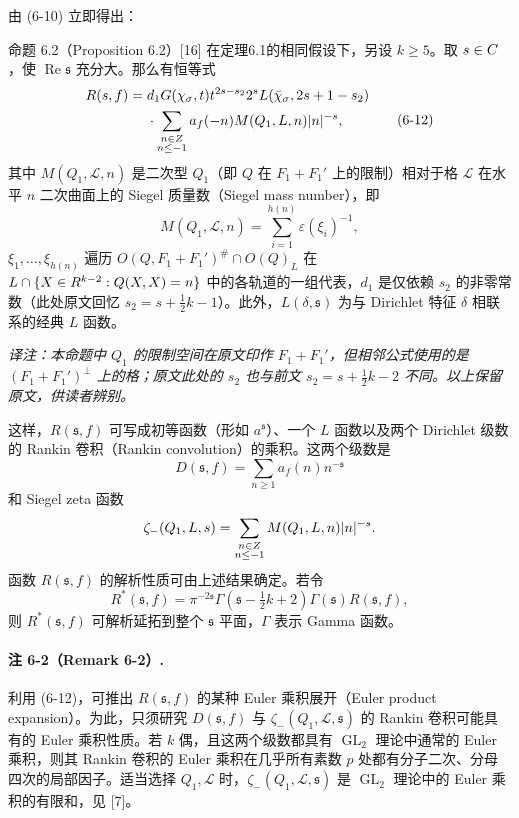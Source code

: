 由 (6-10) 立即得出：
\begin{originaltheorem}{命题 6.2（Proposition 6.2）[16]}
在定理6.1的相同假设下，另设 $k\ge5$。取 $s\in C$，使 $\operatorname{Re}\mathfrak s$ 充分大。那么有恒等式
\begin{equation}
\begin{split}
 R(s,f)={}&d_1G(\chi_\sigma,t)t^{2s-s_2}2^{s}
 L(\bar\chi_\sigma,2s+1-s_2)\\
 &\cdot\sum_{\substack{n\in Z\\n\le-1}}
 a_f(-n)M(Q_1,L,n)|n|^{-s},
\end{split}\tag{6-12}
\end{equation}
其中 $M(Q_1,\mathcal L,n)$ 是二次型 $Q_1$（即 $Q$ 在 $F_1+F_1'$ 上的限制）相对于格 $\mathcal L$ 在水平 $n$ 二次曲面上的 Siegel 质量数（Siegel mass number），即
\[
 M(Q_1,\mathcal L,n)=\sum_{i=1}^{h(n)}\varepsilon(\xi_i)^{-1},
\]
$\xi_1,\ldots,\xi_{h(n)}$ 遍历
$O(Q,F_1+F_1')^\#\cap O(Q)_L$ 在
$L\cap\{X\in R^{k-2}:Q(X,X)=n\}$ 中的各轨道的一组代表，$d_1$ 是仅依赖 $s_2$ 的非零常数（此处原文回忆 $s_2=s+\tfrac12k-1$）。此外，$L(\delta,\mathfrak s)$ 为与 Dirichlet 特征 $\delta$ 相联系的经典 $L$ 函数。
\end{originaltheorem}
\noindent\textit{译注：本命题中 $Q_1$ 的限制空间在原文印作 $F_1+F_1'$，但相邻公式使用的是 $(F_1+F_1')^\perp$ 上的格；原文此处的 $s_2$ 也与前文 $s_2=s+\tfrac12k-2$ 不同。以上保留原文，供读者辨别。}

这样，$R(\mathfrak s,f)$ 可写成初等函数（形如 $a^{\mathfrak s}$）、一个 $L$ 函数以及两个 Dirichlet 级数的 Rankin 卷积（Rankin convolution）的乘积。这两个级数是
\[
 D(\mathfrak s,f)=\sum_{n\ge1}a_f(n)n^{-\mathfrak s}
\]
和 Siegel zeta 函数
\[
 \zeta_-(Q_1,L,s)=\sum_{\substack{n\in Z\\n\le-1}}
 M(Q_1,L,n)|n|^{-s}.
\]
函数 $R(\mathfrak s,f)$ 的解析性质可由上述结果确定。若令
\[
 R^*(\mathfrak s,f)=\pi^{-2\mathfrak s}\Gamma(\mathfrak s-\tfrac12k+2)
 \Gamma(\mathfrak s)R(\mathfrak s,f),
\]
则 $R^*(\mathfrak s,f)$ 可解析延拓到整个 $\mathfrak s$ 平面，$\Gamma$ 表示 Gamma 函数。

\paragraph*{注 6-2（Remark 6-2）.}
利用 (6-12)，可推出 $R(\mathfrak s,f)$ 的某种 Euler 乘积展开（Euler product expansion）。为此，只须研究 $D(\mathfrak s,f)$ 与 $\zeta_-(Q_1,\mathcal L,\mathfrak s)$ 的 Rankin 卷积可能具有的 Euler 乘积性质。若 $k$ 偶，且这两个级数都具有 $\operatorname{GL}_2$ 理论中通常的 Euler 乘积，则其 Rankin 卷积的 Euler 乘积在几乎所有素数 $p$ 处都有分子二次、分母四次的局部因子。适当选择 $Q_1,\mathcal L$ 时，$\zeta_-(Q_1,\mathcal L,\mathfrak s)$ 是 $\operatorname{GL}_2$ 理论中的 Euler 乘积的有限和，见 [7]。

